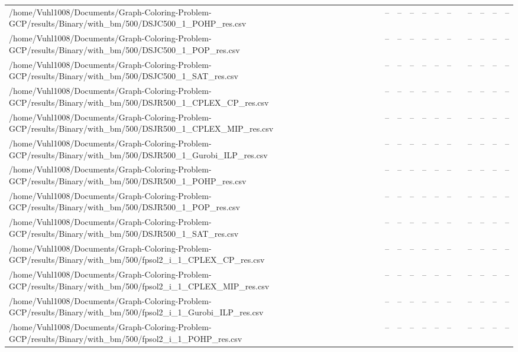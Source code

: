 \begin{table}[htbp]
\begin{tabular}{llllllllllll}
/home/Vuhl1008/Documents/Graph-Coloring-Problem-GCP/results/Binary/with\_bm/500/DSJC500\_1\_POHP\_res.csv & -- & -- & -- & -- & -- & -- & {} & -- & -- & -- & -- \\
/home/Vuhl1008/Documents/Graph-Coloring-Problem-GCP/results/Binary/with\_bm/500/DSJC500\_1\_POP\_res.csv & -- & -- & -- & -- & -- & -- & {} & -- & -- & -- & -- \\
/home/Vuhl1008/Documents/Graph-Coloring-Problem-GCP/results/Binary/with\_bm/500/DSJC500\_1\_SAT\_res.csv & -- & -- & -- & -- & -- & -- & {} & -- & -- & -- & -- \\
/home/Vuhl1008/Documents/Graph-Coloring-Problem-GCP/results/Binary/with\_bm/500/DSJR500\_1\_CPLEX\_CP\_res.csv & -- & -- & -- & -- & -- & -- & {} & -- & -- & -- & -- \\
/home/Vuhl1008/Documents/Graph-Coloring-Problem-GCP/results/Binary/with\_bm/500/DSJR500\_1\_CPLEX\_MIP\_res.csv & -- & -- & -- & -- & -- & -- & {} & -- & -- & -- & -- \\
/home/Vuhl1008/Documents/Graph-Coloring-Problem-GCP/results/Binary/with\_bm/500/DSJR500\_1\_Gurobi\_ILP\_res.csv & -- & -- & -- & -- & -- & -- & {} & -- & -- & -- & -- \\
/home/Vuhl1008/Documents/Graph-Coloring-Problem-GCP/results/Binary/with\_bm/500/DSJR500\_1\_POHP\_res.csv & -- & -- & -- & -- & -- & -- & {} & -- & -- & -- & -- \\
/home/Vuhl1008/Documents/Graph-Coloring-Problem-GCP/results/Binary/with\_bm/500/DSJR500\_1\_POP\_res.csv & -- & -- & -- & -- & -- & -- & {} & -- & -- & -- & -- \\
/home/Vuhl1008/Documents/Graph-Coloring-Problem-GCP/results/Binary/with\_bm/500/DSJR500\_1\_SAT\_res.csv & -- & -- & -- & -- & -- & -- & {} & -- & -- & -- & -- \\
/home/Vuhl1008/Documents/Graph-Coloring-Problem-GCP/results/Binary/with\_bm/500/fpsol2\_i\_1\_CPLEX\_CP\_res.csv & -- & -- & -- & -- & -- & -- & {} & -- & -- & -- & -- \\
/home/Vuhl1008/Documents/Graph-Coloring-Problem-GCP/results/Binary/with\_bm/500/fpsol2\_i\_1\_CPLEX\_MIP\_res.csv & -- & -- & -- & -- & -- & -- & {} & -- & -- & -- & -- \\
/home/Vuhl1008/Documents/Graph-Coloring-Problem-GCP/results/Binary/with\_bm/500/fpsol2\_i\_1\_Gurobi\_ILP\_res.csv & -- & -- & -- & -- & -- & -- & {} & -- & -- & -- & -- \\
/home/Vuhl1008/Documents/Graph-Coloring-Problem-GCP/results/Binary/with\_bm/500/fpsol2\_i\_1\_POHP\_res.csv & -- & -- & -- & -- & -- & -- & {} & -- & -- & -- & -- \\

\end{tabular}
\end{table}
